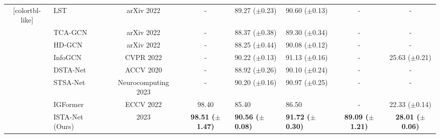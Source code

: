 \documentclass[letterpaper, 10 pt, conference]{ieeeconf}
\begin{document}
\begin{table*}[t]
{\begin{threeparttable}
{\begin{NiceTabular}{c|l|c|c|C{22mm}|C{22mm}|c|c}[colortbl-like]
            &
            LST\cite{LST2022}&
            arXiv 2022&
            -&
            89.27 ($\pm$0.23)&
            90.60 ($\pm$0.13)&
            -&
            -\\

            &
            TCA-GCN\cite{tcagcn2022}&
            arXiv 2022&
            -&
            88.37 ($\pm$0.38)&
            89.30 ($\pm$0.34)&
            -&
            -\\

            &
            HD-GCN\cite{hdgcn2022}&
            arXiv 2022&
            -&
            88.25 ($\pm$0.44)&
            90.08 ($\pm$0.12)&
            -&
            -\\

            &
            InfoGCN\cite{InfoGCN2022}&
            CVPR 2022&
            -&
            90.22 ($\pm$0.13)&
            91.13 ($\pm$0.16)&
            -&
            25.63 ($\pm$0.21)\\

            \hline

            &
            DSTA-Net\cite{dstanet2020}&
            ACCV 2020&
            -&
            88.92 ($\pm$0.26)&
            90.10 ($\pm$0.24)&
            -&
            -\\

            &
            STSA-Net\cite{STSA-Net2023}&
            Neurocomputing 2023&
            -&
            90.20 ($\pm$0.16)&
            90.97 ($\pm$0.25)&
            -&
            -\\

            &
            IGFormer\cite{igformer2022}&
            ECCV 2022&
            98.40&
            85.40&
            86.50&
            -&
            22.33 ($\pm$0.14)\\

            &
            ISTA-Net (Ours)&
            2023&
            \textbf{98.51 ($\pm$1.47)}&
            \textbf{90.56 ($\pm$0.08)}&
            \textbf{91.72 ($\pm$0.30)}&
            \textbf{89.09 ($\pm$1.21)}&
            \textbf{28.01 ($\pm$0.06)}\\
		

\end{NiceTabular}}
\end{threeparttable}}
\end{table*}
\end{document}
